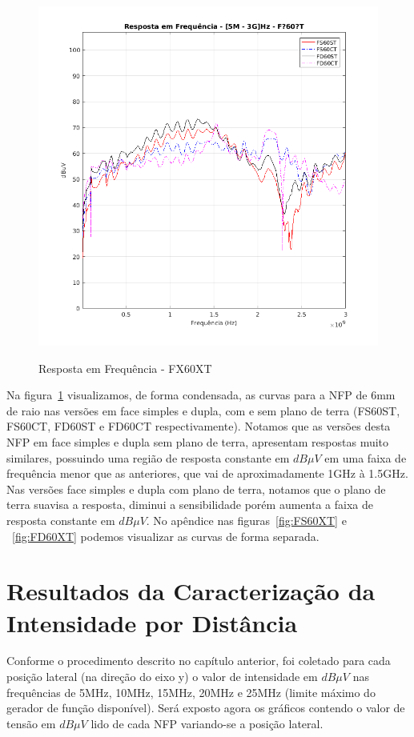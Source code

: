 \begin{figure}[htb!]
	\centering 
	\caption{Resposta em Frequência - FX60XT}
	\includegraphics[scale=0.7]{./img/FX60XT}
	\label{fig:FX60XT}
\end{figure}

Na figura~\ref{fig:FX60XT} visualizamos, de forma condensada, as curvas para a NFP de 6mm de raio nas versões em face simples e dupla, com e sem plano de terra (FS60ST, FS60CT, FD60ST e FD60CT respectivamente). Notamos que as versões desta NFP em face simples e dupla sem plano de terra, apresentam respostas muito similares, possuindo uma região de resposta constante em $dB \mu V$ em uma faixa de frequência menor que as anteriores, que vai de aproximadamente 1GHz à 1.5GHz. Nas versões face simples e dupla com plano de terra, notamos que o plano de terra suavisa a resposta, diminui a sensibilidade porém aumenta a faixa de resposta constante em $dB \mu V$. No apêndice nas figuras~\ref{fig:FS60XT} e ~\ref{fig:FD60XT} podemos visualizar as curvas de forma separada.


\section{Resultados da Caracterização da Intensidade por Distância}
Conforme o procedimento descrito no capítulo anterior, foi coletado para cada posição lateral (na direção do eixo y) o valor de intensidade em $dB \mu V$ nas frequências de 5MHz, 10MHz, 15MHz, 20MHz e 25MHz (limite máximo do gerador de função disponível). Será exposto agora os gráficos contendo o valor de tensão em $dB \mu V$ lido de cada NFP variando-se a posição lateral.

